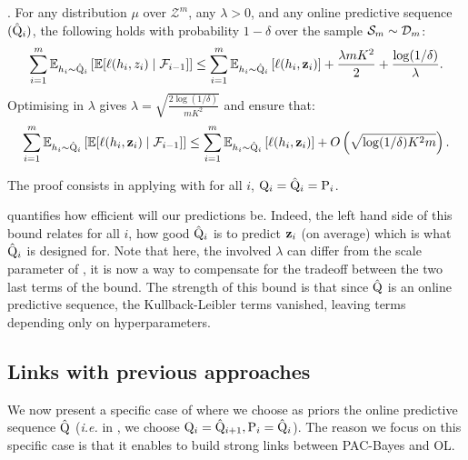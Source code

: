 \begin{corollary}
  \label{cor: test_bound_online}.
  For any distribution $\mu$ over $\mathcal{Z}^m$, any $\lambda>0$, and any online predictive sequence $(\hat{\mathrm{Q}}_i)$, the following holds with probability $1-\delta$ over the sample $\mathcal{S}_m\sim\mathcal{D}_{m}$:
  \begin{align*}
    \sum_{i=1}^m \mathbb{E}_{h_i\sim \hat{\mathrm{Q}}_{i}}\left[ \mathbb{E}[\ell(h_i,z_i) \mid \mathcal{F}_{i-1}]    \right] \leq \sum_{i=1}^m \mathbb{E}_{h_i\sim \hat{\mathrm{Q}}_{i}}\left[ \ell(h_i,\mathbf{z}_i) \right] + \frac{\lambda m K^2}{2} + \frac{\log(1/\delta)}{\lambda}.
  \end{align*}
  Optimising in $\lambda$ gives $\lambda= \sqrt{\frac{2\log(1/\delta)}{mK^2} }$ and ensure that:
  \begin{align*}
    \sum_{i=1}^m \mathbb{E}_{h_i\sim \hat{\mathrm{Q}}_{i}}\left[ \mathbb{E}[\ell(h_i,\mathbf{z}_i) \mid \mathcal{F}_{i-1}]    \right] \leq \sum_{i=1}^m \mathbb{E}_{h_i\sim \hat{\mathrm{Q}}_{i}}\left[ \ell(h_i,\mathbf{z}_i) \right] + O\left(\sqrt{\log(1/\delta) K^2m}\right).
  \end{align*}

\end{corollary}

The proof consists in applying  with for all $i$, $\mathrm{Q}_{i}= \hat{\mathrm{Q}}_{i}= \mathrm{P}_{i}$.

 quantifies how efficient will our predictions be. Indeed, the left hand side of this bound relates for all $i$, how good $\hat{\mathrm{Q}}_i$ is to predict $\mathbf{z}_i$ (on average) which is what $\hat{\mathrm{Q}}_i$ is designed for.
Note that here, the involved $\lambda$ can differ from the scale parameter of , it is now a way to compensate for the tradeoff between the two last terms of the bound. The strength of this bound is that since $\hat{\mathrm{Q}}$ is an online predictive sequence, the Kullback-Leibler terms vanished, leaving terms depending only on hyperparameters.


\subsection*{Links with previous approaches}

We now present a specific case of  where we choose as priors the online predictive sequence $\hat{\mathrm{Q}}$ (\emph{i.e.} in , we choose $\mathrm{Q}_{i}=\hat{\mathrm{Q}}_{i+1}, \mathrm{P}_{i}= \hat{\mathrm{Q}}_i$). The reason we focus on this specific case is that it enables to build strong links between PAC-Bayes and OL.

